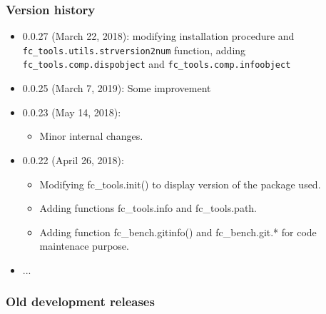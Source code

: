  
\subsubsection{Version history}

\begin{itemize}
\item 0.0.27 (March 22, 2018): modifying installation procedure and \verb+fc_tools.utils.strversion2num+ function, adding \verb+fc_tools.comp.dispobject+
and \verb+fc_tools.comp.infoobject+
\item 0.0.25 (March 7, 2019): Some improvement
\item 0.0.23 (May 14, 2018):
\begin{itemize}
\item Minor internal changes.
\end{itemize}
\item 0.0.22 (April 26, 2018): 
\begin{itemize}
\item Modifying fc_tools.init() to display version of the package used.
\item Adding functions fc_tools.info and fc_tools.path.
\item Adding function fc_bench.gitinfo() and fc_bench.git.* for code maintenace purpose.
\end{itemize}
\item ...
\end{itemize} 
 
\subsubsection{Old development releases} 

\providecommand\fcInsertVersionOld{}
\renewcommand{\fcInsertVersionOld}[2]{
#1 & #2 & 
\BuildLinkWithSizeInKo{\IHTDIR/distrib/#1/fc-tools-#1.tar.gz}
                  {\OHTDIR/#1/fc-tools-#1.tar.gz}
                  {\texttt{[image: images/icons/Octave\_pkg\_40.gif]}}
& 
\begin{tabular}{l}
\BuildLinkWithSizeInKo{\IHTDIR/distrib/#1/ofc-tools-#1.tar.gz}
                  {\OHTDIR/#1/ofc-tools-#1.tar.gz}
                  {\texttt{[image: images/icons/tar-gz\_40.gif]}}
\\ 
\BuildLinkWithSizeInKo{\IHTDIR/distrib/#1/ofc-tools-#1.zip}
                  {\OHTDIR/#1/ofc-tools-#1.zip}
                  {\texttt{[image: images/icons/zip\_new40.gif]}} 
\\ 
\BuildLinkWithSizeInKo{\IHTDIR/distrib/#1/ofc-tools-#1.7z}
                  {\OHTDIR/#1/ofc-tools-#1.7z}
                  {\texttt{[image: images/icons/7z-icon-40.gif]}}                   
\end{tabular}
&
to do!
}

